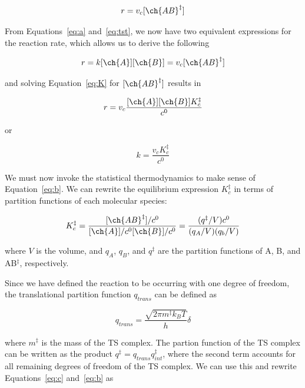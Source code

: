 \begin{equation}
  r = v_c [\ch{AB}^\ddagger]
\end{equation}

From Equations~\ref{eq:a} and~\ref{eq:tst}, we now have two equivalent
expressions for the reaction rate, which allows us to derive the following

\begin{equation}
  r = k[\ch{A}][\ch{B}] = v_c [\ch{AB}^\ddagger]
\end{equation}

\noindent and solving Equation~\ref{eq:K} for $[\ch{AB}^\ddagger]$ results in


\begin{equation}
  r = v_c\frac{[\ch{A}][\ch{B}]K_c^\ddagger}{c^0}
\end{equation}

\noindent or

\begin{equation}
  k = \frac{v_c K_c^\ddagger}{c^0}
\label{eq:b}
\end{equation}

We must now invoke the statistical thermodynamics to make sense of
Equation~\ref{eq:b}. We can rewrite the equilibrium expression $K_c^\ddagger$
in terms of partition functions of each molecular species:

\begin{equation}
    K_c^{\ddagger} = \frac{[\ch{AB}^\ddagger]/c^0}{[\ch{A}]/c^0[\ch{B}]/c^0}
    = \frac{(q^\ddagger/V)c^0}{(q_A/V)(q_b/V)}
\label{eq:c}
\end{equation}

\noindent where $V$ is the volume, and $q_A$, $q_B$, and $q^\ddagger$ are the
partition functions of A, B, and AB$^\ddagger$, respectively.

Since we have defined the reaction to be occurring with one degree of freedom,
the translational partition function $q_{trans}$ can be defined as

\begin{equation}
  q_{trans} = \frac{\sqrt{2\pi m^\ddagger k_B T}}{h}\delta
\end{equation}

\noindent where $m^\ddagger$ is the mass of the TS complex. The partion
function of the TS complex can be written as the product $q^\ddagger =
q_{trans}q_{int}^\ddagger$, where the second term accounts for all remaining
degrees of freedom of the TS complex. We can use this and rewrite
Equations~\ref{eq:c} and~\ref{eq:b} as


